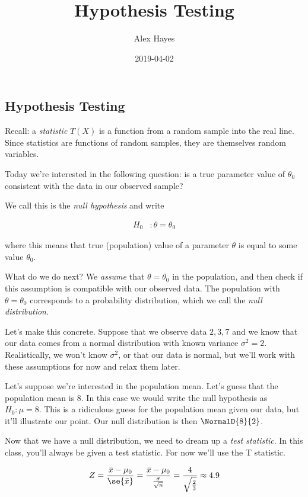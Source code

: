 \documentclass[]{article}
\title{Hypothesis Testing}
\author{Alex Hayes}
\date{2019-04-02}
\begin{document}
\maketitle

\hypertarget{hypothesis-testing}{%
\subsection{Hypothesis Testing}\label{hypothesis-testing}}

Recall: a \emph{statistic} \(T(X)\) is a function from a random sample
into the real line. Since statistics are functions of random samples,
they are themselves random variables.

Today we're interested in the following question: is a true parameter
value of \(\theta_0\) consistent with the data in our observed sample?

We call this is the \emph{null hypothesis} and write

\begin{align}
H_0 &: \theta = \theta_0
\end{align}

where this means that true (population) value of a parameter \(\theta\)
is equal to some value \(\theta_0\).

What do we do next? We \emph{assume} that \(\theta = \theta_0\) in the
population, and then check if this assumption is compatible with our
observed data. The population with \(\theta = \theta_0\) corresponds to
a probability distribution, which we call the \emph{null distribution}.

Let's make this concrete. Suppose that we observe data \(2, 3, 7\) and
we know that our data comes from a normal distribution with known
variance \(\sigma^2 = 2\). Realistically, we won't know \(\sigma^2\), or
that our data is normal, but we'll work with these assumptions for now
and relax them later.

Let's suppose we're interested in the population mean. Let's guess that
the population mean is 8. In this case we would write the null
hypothesis as \(H_0 : \mu = 8\). This is a ridiculous guess for the
population mean given our data, but it'll illustrate our point. Our null
distribution is then \(\NormalD{8}{2}\).

Now that we have a null distribution, we need to dream up a \emph{test
statistic}. In this class, you'll always be given a test statistic. For
now we'll use the T statistic.

\[
Z = {\bar x - \mu_0 \over \se{\bar x}} = {\bar x - \mu_0 \over {\sigma \over \sqrt n}} = {4 \over \sqrt \frac 23} \approx 4.9
\]
\end{document}
